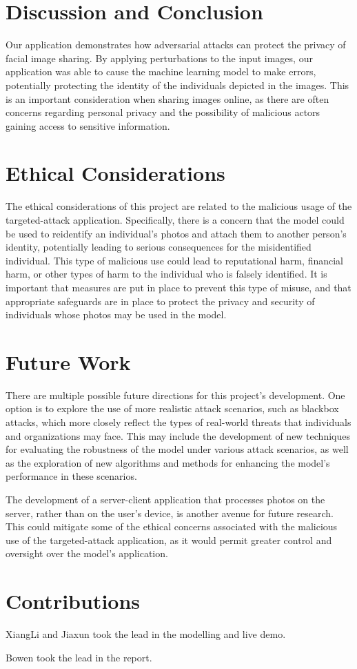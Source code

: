 \section{Discussion and Conclusion}

Our application demonstrates how adversarial attacks can protect the privacy of facial image sharing. By applying perturbations to the input images, our application was able to cause the machine learning model to make errors, potentially protecting the identity of the individuals depicted in the images. This is an important consideration when sharing images online, as there are often concerns regarding personal privacy and the possibility of malicious actors gaining access to sensitive information.

\section{Ethical Considerations}

The ethical considerations of this project are related to the malicious usage of the targeted-attack application. Specifically, there is a concern that the model could be used to reidentify an individual's photos and attach them to another person's identity, potentially leading to serious consequences for the misidentified individual. This type of malicious use could lead to reputational harm, financial harm, or other types of harm to the individual who is falsely identified. It is important that measures are put in place to prevent this type of misuse, and that appropriate safeguards are in place to protect the privacy and security of individuals whose photos may be used in the model.

\section{Future Work}

There are multiple possible future directions for this project's development. One option is to explore the use of more realistic attack scenarios, such as blackbox attacks, which more closely reflect the types of real-world threats that individuals and organizations may face. This may include the development of new techniques for evaluating the robustness of the model under various attack scenarios, as well as the exploration of new algorithms and methods for enhancing the model's performance in these scenarios.

The development of a server-client application that processes photos on the server, rather than on the user's device, is another avenue for future research. This could mitigate some of the ethical concerns associated with the malicious use of the targeted-attack application, as it would permit greater control and oversight over the model's application.

\appendix

\section{Contributions}

XiangLi and Jiaxun took the lead in the modelling and live demo. 

Bowen took the lead in the report.


